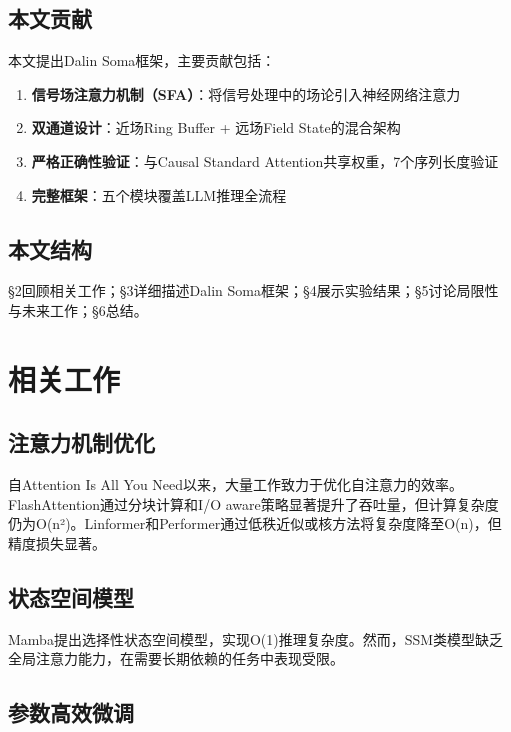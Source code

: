\documentclass[12pt, a4paper]{article}
\begin{document}
\subsection{本文贡献}

本文提出Dalin Soma框架，主要贡献包括：

\begin{enumerate}
    \item \textbf{信号场注意力机制（SFA）}：将信号处理中的场论引入神经网络注意力
    \item \textbf{双通道设计}：近场Ring Buffer + 远场Field State的混合架构
    \item \textbf{严格正确性验证}：与Causal Standard Attention共享权重，7个序列长度验证
    \item \textbf{完整框架}：五个模块覆盖LLM推理全流程
\end{enumerate}

\subsection{本文结构}

§2回顾相关工作；§3详细描述Dalin Soma框架；§4展示实验结果；§5讨论局限性与未来工作；§6总结。

\newpage

\section{相关工作}

\subsection{注意力机制优化}

自Attention Is All You Need\cite{vaswani2017attention}以来，大量工作致力于优化自注意力的效率。FlashAttention\cite{dao2022flashattention}通过分块计算和I/O aware策略显著提升了吞吐量，但计算复杂度仍为O(n²)。Linformer\cite{khandelwal2020generalization}和Performer\cite{wang2020efficient}通过低秩近似或核方法将复杂度降至O(n)，但精度损失显著。

\subsection{状态空间模型}

Mamba\cite{gu2023mamba}提出选择性状态空间模型，实现O(1)推理复杂度。然而，SSM类模型缺乏全局注意力能力，在需要长期依赖的任务中表现受限。

\subsection{参数高效微调}
\end{document}
